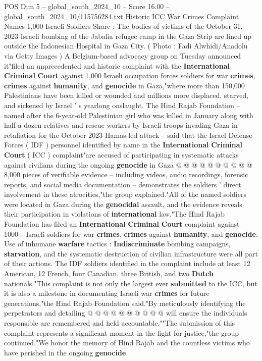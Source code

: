 \begin{textsample}{POS Dim 5 – global\_south\_2024\_10 – Score 16.00 – global\_south\_2024\_10/115756284.txt}  \label{ex:f5_pos_345}
Historic ICC War Crimes Complaint Names 1,000 Israeli Soldiers Share : The bodies of victims of the October 31, 2023 Israeli bombing of the Jabalia refugee camp in the Gaza Strip are lined up outside the Indonesian Hospital in Gaza City. ( Photo : Fadi Alwhidi/Anadolu via Getty Images ) A Belgium-based advocacy group on Tuesday announced it"filed an unprecedented and historic complaint with the \textbf{International} \textbf{Criminal} \textbf{Court} against 1,000 Israeli occupation forces soldiers for war \textbf{crimes}, \textbf{crimes} against \textbf{humanity}, and \textbf{genocide} in Gaza,"where more than 150,000 Palestinians have been killed or wounded and millions more displaced, starved, and sickened by Israel ' s yearlong onslaught.
The Hind Rajab Foundation -- named after the 6-year-old Palestinian girl who was killed in January along with half a dozen relatives and rescue workers by Israeli troops invading Gaza in retaliation for the October 2023 Hamas-led attack -- said that the Israel Defense Forces ( IDF ) personnel identified by name in the \textbf{International} \textbf{Criminal} \textbf{Court} ( ICC ) complaint"are accused of participating in systematic attacks against civilians during the ongoing \textbf{genocide} in Gaza @ @ @ @ @ @ @ @ @ @ 8,000 pieces of verifiable evidence -- including videos, audio recordings, forensic reports, and social media documentation -- demonstrates the soldiers ' direct involvement in these atrocities,"the group explained."All of the named soldiers were located in Gaza during the \textbf{genocidal} assault, and the evidence reveals their participation in violations of \textbf{international} law."The Hind Rajab Foundation has filed an \textbf{International} \textbf{Criminal} \textbf{Court} complaint against 1000+ Israeli soldiers for war \textbf{crimes}, \textbf{crimes} against \textbf{humanity}, and \textbf{genocide}.
Use of inhumane \textbf{warfare} tactics : \textbf{Indiscriminate} bombing campaigns, \textbf{starvation}, and the systematic destruction of civilian infrastructure were all part of their actions.
The IDF soldiers identified in the complaint include at least 12 American, 12 French, four Canadian, three British, and two \textbf{Dutch} nationals."This complaint is not only the largest ever \textbf{submitted} to the ICC, but it is also a milestone in documenting Israeli war \textbf{crimes} for future generations,"the Hind Rajab Foundation said."By meticulously identifying the perpetrators and detailing @ @ @ @ @ @ @ @ @ @ will ensure the individuals responsible are remembered and held accountable.""The submission of this complaint represents a significant moment in the fight for justice,"the group continued."We honor the memory of Hind Rajab and the countless victims who have perished in the ongoing \textbf{genocide}.

\end{textsample}
